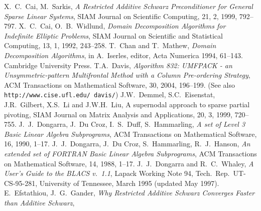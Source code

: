 \begin{thebibliography}{99}
%
%
%
X.~C.~Cai, M.~Sarkis,
{\em A Restricted Additive Schwarz Preconditioner for General Sparse Linear Systems},
SIAM Journal on Scientific Computing, 21, 2, 1999, 792--797.
%
X.~C.~Cai, O.~B.~Widlund,
{\em Domain Decomposition Algorithms for Indefinite Elliptic Problems},
SIAM Journal on Scientific and Statistical Computing, 13, 1, 1992, 243--258.
%
T.~Chan and T.~Mathew,
{\em Domain Decomposition Algorithms},
in A.~Iserles, editor, Acta Numerica 1994, 61--143.
Cambridge University Press.
% 
T.A.~Davis, 
{\em Algorithm 832: UMFPACK - an Unsymmetric-pattern Multifrontal
Method with a Column Pre-ordering Strategy},
ACM Transactions on Mathematical Software, 30, 2004, 196--199.
(See also {\tt http://www.cise.ufl.edu/~davis/})
%
J.W.~Demmel, S.C.~Eisenstat, J.R.~Gilbert, X.S.~Li and J.W.H.~Liu,
A supernodal approach to sparse partial pivoting,
SIAM Journal on Matrix Analysis and Applications, 20, 3, 1999, 720--755.
%
J.~J.~Dongarra, J.~Du Croz, I.~S.~Duff, S.~Hammarling,
\emph{A set of Level 3 Basic Linear Algebra Subprograms},
ACM Transactions on Mathematical Software, 16, 1990, 1--17.
%
J.~J.~Dongarra, J.~Du Croz, S.~Hammarling, R.~J.~Hanson,
\emph{An extended set of FORTRAN Basic Linear Algebra Subprograms},
ACM Transactions on Mathematical Software, 14, 1988, 1--17.
%
J.~J.~Dongarra and R.~C.~Whaley,
{\em A User's Guide to the BLACS v.~1.1},
Lapack Working Note 94, Tech.\ Rep.\ UT-CS-95-281, University of
Tennessee, March 1995 (updated May 1997).
%
%
%
E.~Efstathiou, J.~G.~Gander,
{\em Why Restricted Additive Schwarz Converges Faster than Additive Schwarz},

\end{thebibliography}
